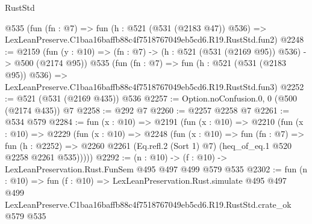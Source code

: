 \begin{lexlean}{RustStd}
\begin{coremodule}
    @535
    (fun (fn : @7) =>
    fun (h : @521 (@531 (@2183 @47)) @536) =>
    LexLeanPreserve.C1baa16baffb88c4f7518767049eb5cd6.R19.RustStd.fun2)
@2248 := @2159
    (fun (y : @10) => (fn : @7) -> (h : @521 (@531 (@2169 @95)) @536) -> @500 (@2174 @95))
    @535
    (fun (fn : @7) =>
    fun (h : @521 (@531 (@2183 @95)) @536) =>
    LexLeanPreserve.C1baa16baffb88c4f7518767049eb5cd6.R19.RustStd.fun3)
@2252 := @521 (@531 (@2169 @435)) @536
@2257 := Option.noConfusion.{0, 0} (@500 (@2174 @435)) @7
@2258 := @292 @7
@2260 := @2257 @2258 @7
@2261 := @534 @579
@2284 := fun (x : @10) =>
  @2191
    (fun (x : @10) =>
    @2210
      (fun (x : @10) =>
      @2229
        (fun (x : @10) =>
        @2248
          (fun (x : @10) =>
          fun (fn : @7) =>
          fun (h : @2252) =>
          @2260 @2261 (Eq.refl.{2} (Sort 1) @7) (heq_of_eq.{1} @520 @2258 @2261 @535)))))
@2292 := (n : @10) -> (f : @10) -> LexLeanPreservation.Rust.FunSem @495 @497 @499 @579 @535
@2302 := fun (n : @10) =>
  fun (f : @10) =>
  LexLeanPreservation.Rust.simulate
    @495
    @497
    @499
    LexLeanPreserve.C1baa16baffb88c4f7518767049eb5cd6.R19.RustStd.crate_ok
    @579
    @535
\end{coremodule}
\end{lexlean}
